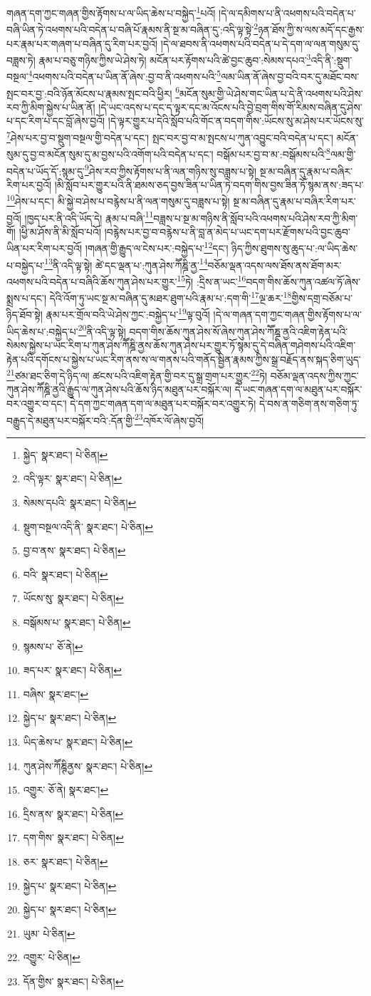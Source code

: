 གཞན་དག་ཀྱང་གཞན་གྱིས་རྟོགས་པ་ལ་ཡིད་ཆེས་པ་བསྐྱེད་\footnote{སྐྱེད་  སྣར་ཐང་།  པེ་ཅིན། }པའོ། །དེ་ལ་དམིགས་པ་ནི་འཕགས་པའི་བདེན་པ་བཞི་ཡིན་ཏེ་འཕགས་པའི་བདེན་པ་བཞི་པོ་རྣམས་ནི་སྔ་མ་བཞིན་དུ་:འདི་ལྟ་སྟེ་\footnote{འདི་ལྟར་  སྣར་ཐང་།  པེ་ཅིན། }ཉན་ཐོས་ཀྱི་ས་ལས་མདོ་དང་རྒྱས་པར་རྣམ་པར་གཞག་པ་བཞིན་དུ་རིག་པར་བྱའོ། །དེ་ལ་ཐབས་ནི་འཕགས་པའི་བདེན་པ་དེ་དག་ལ་ལན་གསུམ་དུ་བཟླས་ཏེ། རྣམ་པ་བཅུ་གཉིས་ཀྱིས་ཡེ་ཤེས་ཏེ། མངོན་པར་རྟོགས་པའི་ཚེ་བྱང་ཆུབ་:སེམས་དཔའ་\footnote{སེམས་དཔའི་  སྣར་ཐང་།  པེ་ཅིན། }འདི་ནི་:སྡུག་བསྔལ་\footnote{སྡུག་བསྔལ་འདི་ནི་  སྣར་ཐང་།  པེ་ཅིན། }འཕགས་པའི་བདེན་པ་ཡིན་ནོ་ཞེས་:བྱ་བ་ནི་འཕགས་པའི་\footnote{བྱ་བ་ནས་  སྣར་ཐང་།  པེ་ཅིན། }ལམ་ཡིན་ནོ་ཞེས་བྱ་བའི་བར་དུ་མཐོང་བས་སྤང་བར་བྱ་:བའི་ཉོན་མོངས་པ་རྣམས་སྤང་བའི་ཕྱིར། \footnote{བའི་  སྣར་ཐང་།  པེ་ཅིན། }མངོན་སུམ་གྱི་ཡེ་ཤེས་གང་ཡིན་པ་དེ་ནི་འཕགས་པའི་ཤེས་རབ་ཀྱི་མིག་སྐྱེས་པ་ཡིན་ནོ། །དེ་ཡང་འདས་པ་དང་ད་ལྟར་དང་མ་འོངས་པའི་བྱེ་བྲག་གིས་གོ་རིམས་བཞིན་དུ་ཤེས་པ་དང་རིག་པ་དང་བློ་ཞེས་བྱའོ། །དེ་ལྟར་གྱུར་པ་དེའི་སློབ་པའི་གོང་ན་བདག་གིས་:ཡོངས་སུ་མ་ཤེས་པར་ཡོངས་སུ་\footnote{ཡོངས་སུ་  སྣར་ཐང་།  པེ་ཅིན། }ཤེས་པར་བྱ་བ་སྡུག་བསྔལ་གྱི་བདེན་པ་དང་། སྤང་བར་བྱ་བ་མ་སྤངས་པ་ཀུན་འབྱུང་བའི་བདེན་པ་དང་། མངོན་སུམ་དུ་བྱ་བ་མངོན་སུམ་དུ་མ་བྱས་པའི་འགོག་པའི་བདེན་པ་དང་། བསྒོམ་པར་བྱ་བ་མ་:བསྒོམས་པའི་\footnote{བསྒོམས་པ་  སྣར་ཐང་།  པེ་ཅིན། }ལམ་གྱི་བདེན་པ་ཡོད་དོ་:སྙམ་དུ་\footnote{སྙམས་པ་  ཅོ་ནེ། }ཤེས་རབ་ཀྱིས་རྟོགས་པ་ནི་ལན་གཉིས་སུ་བཟླས་པ་སྟེ། སྔ་མ་བཞིན་དུ་རྣམ་པ་བཞིར་རིག་པར་བྱའོ། །མི་སློབ་པར་གྱུར་པའི་ནི་ཐམས་ཅད་བྱས་ཟིན་པ་ཡིན་ཏེ་བདག་གིས་བྱས་ཟིན་ཏོ་སྙམ་ནས་:ཟད་པ་\footnote{ཟད་པར་  སྣར་ཐང་།  པེ་ཅིན། }ཤེས་པ་དང་། མི་སྐྱེ་བ་ཤེས་པ་བརྙེས་པ་ནི་ལན་གསུམ་དུ་བཟླས་པ་སྟེ། སྔ་མ་བཞིན་དུ་རྣམ་པ་བཞིར་རིག་པར་བྱའོ། །ཁྱད་པར་ནི་འདི་ཡོད་དེ། རྣམ་པ་བཞི་\footnote{བཞིས་  སྣར་ཐང་། }བཟླས་པ་སྔ་མ་གཉིས་ནི་སློབ་པའི་འཕགས་པའི་ཤེས་རབ་ཀྱི་མིག་གོ། །ཕྱི་མ་ཤོས་ནི་མི་སློབ་པའོ། །བརྙེས་པར་བྱ་བ་བརྙེས་པ་ནི་བླ་ན་མེད་པ་ཡང་དག་པར་རྫོགས་པའི་བྱང་ཆུབ་ཡིན་པར་རིག་པར་བྱའོ། །གཞན་གྱི་རྒྱུད་ལ་ངེས་པར་:བསྐྱེད་པ་\footnote{སྐྱེད་པ་  སྣར་ཐང་།  པེ་ཅིན། }དང་། ཉིད་ཀྱིས་ཐུགས་སུ་ཆུད་པ་:ལ་ཡིད་ཆེས་པ་བསྐྱེད་པ་\footnote{ཡིད་ཆེས་པ་  སྣར་ཐང་།  པེ་ཅིན། }ནི་འདི་ལྟ་སྟེ། ཚེ་དང་ལྡན་པ་:ཀུན་ཤེས་ཀཽཎྜི་ནྱ་\footnote{ཀུན་ཤེས་ཀཽཎྚིནྱས་  སྣར་ཐང་།  པེ་ཅིན། }བཅོམ་ལྡན་འདས་ལས་ཐོས་ནས་ཐོག་མར་འཕགས་པའི་བདེན་པ་བཞིའི་ཆོས་ཀུན་ཤེས་པར་གྱུར་\footnote{འགྱུར་  ཅོ་ནེ།  སྣར་ཐང་། }ཏེ། :དྲིས་ན་ཡང་\footnote{དྲིས་ནས་  སྣར་ཐང་།  པེ་ཅིན། }བདག་གིས་ཆོས་ཀུན་འཚལ་ཏོ་ཞེས་སྨྲས་པ་དང་། དེའི་འོག་ཏུ་ཡང་སྔ་མ་བཞིན་དུ་མཐར་ཐུག་པའི་རྣམ་པ་:དག་གི་\footnote{དག་གིས་  སྣར་ཐང་།  པེ་ཅིན། }ལྔ་ཆར་\footnote{ཅར་  སྣར་ཐང་།  པེ་ཅིན། }གྱིས་དགྲ་བཅོམ་པ་ཉིད་ཐོབ་སྟེ། རྣམ་པར་གྲོལ་བའི་ཡེ་ཤེས་ཀྱང་:བསྐྱེད་པ་\footnote{སྐྱེད་པ་  སྣར་ཐང་།  པེ་ཅིན། }ལྟ་བུའོ། །དེ་ལ་གཞན་དག་ཀྱང་གཞན་གྱིས་རྟོགས་པ་ལ་ཡིད་ཆེས་པ་:བསྐྱེད་པ་\footnote{སྐྱེད་པ་  སྣར་ཐང་།  པེ་ཅིན། }ནི་འདི་ལྟ་སྟེ། བདག་གིས་ཆོས་ཀུན་ཤེས་སོ་ཞེས་ཀུན་ཤེས་ཀཽཎྜ་ནྱའི་འཇིག་རྟེན་པའི་སེམས་སྐྱེས་པ་ཡང་རིག་པ་ཀུན་ཤེས་ཀཽཎྜི་ནྱས་ཆོས་ཀུན་ཤེས་པར་གྱུར་ཏོ་སྙམ་དུ་དེ་བཞིན་གཤེགས་པའི་འཇིག་རྟེན་པའི་དགོངས་པ་སྐྱེས་པ་ཡང་རིག་ནས་ས་ལ་གནས་པའི་གནོད་སྦྱིན་རྣམས་ཀྱིས་སྒྲ་བརྗོད་ནས་སྐད་ཅིག་ཡུད་\footnote{ཡུམ་  པེ་ཅིན། }ཙམ་ཐང་ཅིག་དེ་ཉིད་ལ། ཚངས་པའི་འཇིག་རྟེན་གྱི་བར་དུ་སྒྲ་གྲག་པར་གྱུར་\footnote{འགྱུར་  པེ་ཅིན། }ཏེ། བཅོམ་ལྡན་འདས་ཀྱིས་ཀྱང་ཀུན་ཤེས་ཀཽཎྜི་ནྱའི་རྒྱུད་ལ་ཀུན་ཤེས་པའི་ཆོས་ཉིད་མཐུན་པར་བསྐོར་ལ། དེ་ཡང་གཞན་དག་ལ་མཐུན་པར་བསྐོར་བར་འགྱུར་བ་དང་། དེ་དག་ཀྱང་གཞན་དག་ལ་མཐུན་པར་བསྐོར་བར་འགྱུར་ཏེ། དེ་བས་ན་གཅིག་ནས་གཅིག་ཏུ་བརྒྱུད་དེ་མཐུན་པར་བསྐོར་བའི་:དོན་གྱི་\footnote{དོན་གྱིས་  སྣར་ཐང་།  པེ་ཅིན། }འཁོར་ལོ་ཞེས་བྱའོ། 